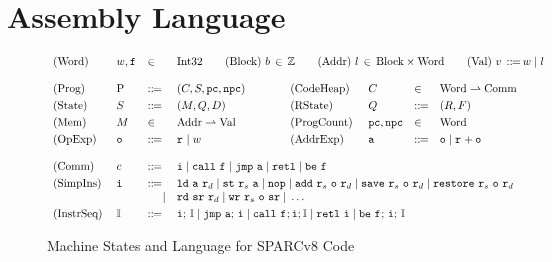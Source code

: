 \section{\sparc{} Assembly Language}
\label{sec:modeling}
\begin{figure}[!t]
	\centering
	\small
	\[
		\begin{array}{llllcllll}
			\TYPE{(Word)} & \word, \lab{} & \in &
			\multicolumn{6}{l}
			{
				\TYPE{Int32} \qquad
				\TYPE{(Block)} \ \block \, \in \, \Ztype
				\qquad
				\TYPE{(Addr)} \ \loc \, \in \,
					\TYPE{Block} \times \TYPE{Word}
				\qquad
				\TYPE{(Val)} \ \val \,
					\define \, \word \sepline \loc
			}
			\\
			\\
			\TYPE{(Prog)} & \prog & \define &
				(\code, \state, \pc, \npc) & \qquad &
			\TYPE{(CodeHeap)} \ \ & \code \ & \in &
				\TYPE{Word} \rightharpoonup \TYPE{Comm}
			\\
			\\[-9pt]
			\TYPE{(State)} & \state & \define &
				(\mem, \Rstate, \DBuf) & &
			\TYPE{(RState)} & \Rstate & \define &
				(\RFile, \Wstack)
			\\
			\\[-9pt]
			\TYPE{(Mem)} & \mem & \in &
				\TYPE{Addr} \rightharpoonup \TYPE{Val}
			& &
			\TYPE{(ProgCount)} & \pc, \npc & \in & \TYPE{Word}
			\\
			\\[-9pt]
			\TYPE{(OpExp)} & \oexp & \define &
				\reg{} \sepline \word & &
			\TYPE{(AddrExp)} & \aexp & \define &
				\oexp \sepline \reg{} + \oexp \\
			\\
			\TYPE{(Comm)} & \comm & \define &
			\multicolumn{6}{l}
			{
				\simplins{} \sepline \call{} \ \lab{}
				\sepline \jmp{} \ \aexp \sepline \retl{} \sepline
				\be \ \lab{}
			} \\
			\\[-9pt]
			\TYPE{(SimpIns)} \ & \simplins{} & \define &
			\multicolumn{6}{l}
			{
				\ld{} \ \aexp \ \reg{d} \sepline
				\st{} \ \reg{s} \ \aexp \sepline
				\nop{} \sepline
				\cadd{} \ \reg{s} \ \oexp \ \reg{d} \sepline
				\csave{} \ \reg{s} \ \oexp \ \reg{d} \sepline
				\crestore{} \ \reg{s} \ \oexp \ \reg{d}
			} \\
			& & \ \ \ \ | &
			\multicolumn{6}{l}
			{
				\rd{} \ \sr \ \reg{d} \sepline
				\cwr{} \ \reg{s} \ \oexp \ \sr \sepline
				\dots
			} \\
			\\[-9pt]
			\TYPE{(InstrSeq)} & \cblk & \define &
			\multicolumn{6}{l}
			{
				\simplins{}; \, \cblk \sepline
				\jmp{} \ \aexp; \, \simplins{} \sepline
				\call{} \ \lab{}; \simplins{}; \cblk \sepline
				\retl{} \ \simplins{} \sepline
				\be{} \ \lab{}; \, \simplins{}; \, \cblk
			}
		\end{array}
	\]
	\vspace*{-0.5em}
	\caption{Machine States and Language for SPARCv8 Code}
	\label {fig:Machine States and Language for SPARC Code}
	\vspace*{-0.5em}
\end{figure}

